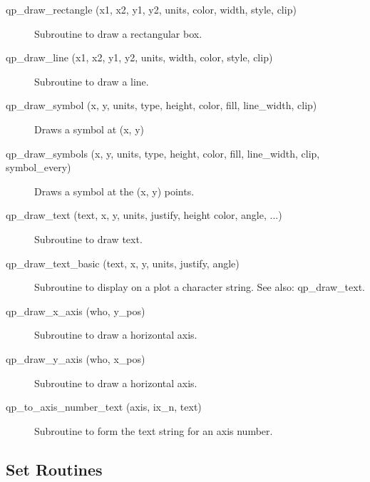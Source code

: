 \begin{description}
\item[qp\_draw\_rectangle (x1, x2, y1, y2, units, color, width,
                                             style, clip) ] \Newline 
     Subroutine to draw a rectangular box.

\item[qp\_draw\_line (x1, x2, y1, y2, units, width, color, style, clip)] \Newline 
     Subroutine to draw a line.

\item[qp\_draw\_symbol (x, y, units, type, height, color, 
                                fill, line\_width, clip) ] \Newline 
     Draws a symbol at (x, y) 

\item[qp\_draw\_symbols (x, y, units, type, height, color,
            fill, line\_width, clip, symbol\_every) ] \Newline 
     Draws a symbol at the (x, y) points. 

\item[qp\_draw\_text (text, x, y, units, justify, height
        color, angle, ...) ] \Newline 
     Subroutine to draw text.

\item[qp\_draw\_text\_basic (text, x, y, units, justify, angle)] \Newline 
     Subroutine to display on a plot a character string.
     See also: qp\_draw\_text.

\item[qp\_draw\_x\_axis (who, y\_pos)] \Newline 
     Subroutine to draw a horizontal axis.

\item[qp\_draw\_y\_axis (who, x\_pos)] \Newline 
     Subroutine to draw a horizontal axis.

\item[qp\_to\_axis\_number\_text (axis, ix\_n, text)] \Newline 
     Subroutine to form the text string for an axis number.

\end{description}

\subsection{Set Routines}

